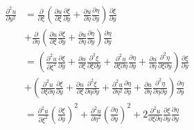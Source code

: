 \documentclass[twoside, 11pt, a4paper]{article}
\begin{document}
\[
  \begin{split}
    \frac{\partial^2 u}{\partial y^2} &= \frac{\partial}{\partial\xi}\left(\frac{\partial u}{\partial\xi}\frac{\partial \xi}{\partial y} + \frac{\partial u}{\partial\eta}\frac{\partial \eta}{\partial y}\right)\frac{\partial\xi}{\partial y} \\
    &+ \frac{\partial}{\partial\eta}\left(\frac{\partial u}{\partial\xi}\frac{\partial \xi}{\partial y} + \frac{\partial u}{\partial\eta}\frac{\partial \eta}{\partial y}\right)\frac{\partial\eta}{\partial y} \\
    &= \left(\frac{\partial^2u}{\partial\xi^2}\frac{\partial\xi}{\partial y} + \frac{\partial u}{\partial\xi}\frac{\partial^2\xi}{\partial\xi\partial y} + \frac{\partial^2u}{\partial\xi\partial\eta}\frac{\partial\eta}{\partial y}+\frac{\partial u}{\partial\eta}\frac{\partial^2\eta}{\partial\xi\partial y}\right)\frac{\partial\xi}{\partial y} \\
    &+\left(\frac{\partial^2u}{\partial\xi\partial\eta}\frac{\partial\xi}{\partial y} + \frac{\partial u}{\partial\xi}\frac{\partial^2\xi}{\partial \eta\partial y} + \frac{\partial^2 u}{\partial\eta^2}\frac{\partial\eta}{\partial y} + \frac{\partial u}{\partial\eta}\frac{\partial^2\eta}{\partial\eta\partial y}\right)\frac{\partial\eta}{\partial y} \\
    &= \frac{\partial^2 u}{\partial\xi^2}\left(\frac{\partial\xi}{\partial y}\right)^2 + \frac{\partial^2u}{\partial\eta^2}\left(\frac{\partial\eta}{\partial y}\right)^2 + 2\frac{\partial^2u}{\partial\xi\partial\eta}\frac{\partial\xi}{\partial y}\frac{\partial\eta}{\partial y}
  \end{split}
\]
\end{document}
